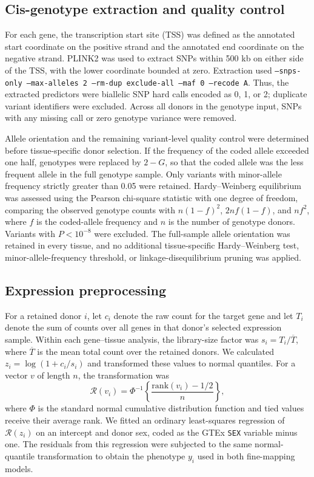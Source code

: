 \documentclass[12pt]{article}
\begin{document}
\subsection{Cis-genotype extraction and quality control}
For each gene, the transcription start site (TSS) was defined as the annotated
start coordinate on the positive strand and the annotated end coordinate on
the negative strand. PLINK2 was used to extract SNPs within 500 kb on either
side of the TSS, with the lower coordinate bounded at zero. Extraction used
\texttt{--snps-only --max-alleles 2 --rm-dup exclude-all --maf 0 --recode A}.
Thus, the extracted predictors were biallelic SNP hard calls encoded as
0, 1, or 2; duplicate variant identifiers were excluded. Across all donors
in the genotype input, SNPs with any missing call or zero genotype variance
were removed.

Allele orientation and the remaining variant-level quality control were
determined before tissue-specific donor selection. If the frequency of the
coded allele exceeded one half, genotypes were replaced by $2-G$, so that
the coded allele was the less frequent allele in the full genotype sample.
Only variants with minor-allele frequency strictly greater than 0.05 were
retained. Hardy--Weinberg equilibrium was assessed using the Pearson
chi-square statistic with one degree of freedom, comparing the observed
genotype counts with $n(1-f)^2$, $2nf(1-f)$, and $nf^2$, where $f$ is the
coded-allele frequency and $n$ is the number of genotype donors. Variants
with $P<10^{-8}$ were excluded. The full-sample allele orientation was
retained in every tissue, and no additional tissue-specific
Hardy--Weinberg test, minor-allele-frequency threshold, or
linkage-disequilibrium pruning was applied.

\subsection{Expression preprocessing}
For a retained donor $i$, let $c_i$ denote the raw count for the target gene
and let $T_i$ denote the sum of counts over all genes in that donor's selected
expression sample. Within each gene--tissue analysis, the library-size factor
was $s_i=T_i/\overline{T}$, where $\overline{T}$ is the mean total count over
the retained donors. We calculated $z_i=\log(1+c_i/s_i)$ and transformed
these values to normal quantiles. For a vector $v$ of length $n$, the
transformation was
\begin{equation}
 \mathcal{R}(v_i)=\Phi^{-1}\left\{\frac{\mathrm{rank}(v_i)-1/2}{n}\right\},
\end{equation}
where $\Phi$ is the standard normal cumulative distribution function and
tied values receive their average rank. We fitted an ordinary least-squares
regression of $\mathcal{R}(z_i)$ on an intercept and donor sex, coded as the
GTEx \texttt{SEX} variable minus one. The residuals from this regression
were subjected to the same normal-quantile transformation to obtain the
phenotype $y_i$ used in both fine-mapping models.
\end{document}
